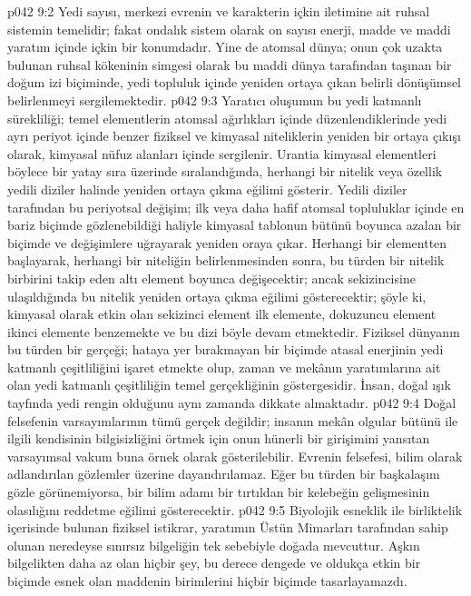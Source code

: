 \vs p042 9:2 Yedi sayısı, merkezi evrenin ve karakterin içkin iletimine ait ruhsal sistemin temelidir; fakat ondalık sistem olarak on sayısı enerji, madde ve maddi yaratım içinde içkin bir konumdadır. Yine de atomsal dünya; onun çok uzakta bulunan ruhsal kökeninin simgesi olarak bu maddi dünya tarafından taşınan bir doğum izi biçiminde, yedi topluluk içinde yeniden ortaya çıkan belirli dönüşümsel belirlenmeyi sergilemektedir.
\vs p042 9:3 Yaratıcı oluşumun bu yedi katmanlı sürekliliği; temel elementlerin atomsal ağırlıkları içinde düzenlendiklerinde yedi ayrı periyot içinde benzer fiziksel ve kimyasal niteliklerin yeniden bir ortaya çıkışı olarak, kimyasal nüfuz alanları içinde sergilenir. Urantia kimyasal elementleri böylece bir yatay sıra üzerinde sıralandığında, herhangi bir nitelik veya özellik yedili diziler halinde yeniden ortaya çıkma eğilimi gösterir. Yedili diziler tarafından bu periyotsal değişim; ilk veya daha hafif atomsal topluluklar içinde en bariz biçimde gözlenebildiği haliyle kimyasal tablonun bütünü boyunca azalan bir biçimde ve değişimlere uğrayarak yeniden oraya çıkar. Herhangi bir elementten başlayarak, herhangi bir niteliğin belirlenmesinden sonra, bu türden bir nitelik birbirini takip eden altı element boyunca değişecektir; ancak sekizincisine ulaşıldığında bu nitelik yeniden ortaya çıkma eğilimi gösterecektir; şöyle ki, kimyasal olarak etkin olan sekizinci element ilk elemente, dokuzuncu element ikinci elemente benzemekte ve bu dizi böyle devam etmektedir. Fiziksel dünyanın bu türden bir gerçeği; hataya yer bırakmayan bir biçimde atasal enerjinin yedi katmanlı çeşitliliğini işaret etmekte olup, zaman ve mekânın yaratımlarına ait olan yedi katmanlı çeşitliliğin temel gerçekliğinin göstergesidir. İnsan, doğal ışık tayfında yedi rengin olduğunu aynı zamanda dikkate almaktadır.
\vs p042 9:4 Doğal felsefenin varsayımlarının tümü gerçek değildir; insanın mekân olgular bütünü ile ilgili kendisinin bilgisizliğini örtmek için onun hünerli bir girişimini yansıtan varsayımsal vakum buna örnek olarak gösterilebilir. Evrenin felsefesi, bilim olarak adlandırılan gözlemler üzerine dayandırılamaz. Eğer bu türden bir başkalaşım gözle görünemiyorsa, bir bilim adamı bir tırtıldan bir kelebeğin gelişmesinin olasılığını reddetme eğilimi gösterecektir.
\vs p042 9:5 Biyolojik esneklik ile birliktelik içerisinde bulunan fiziksel istikrar, yaratımın Üstün Mimarları tarafından sahip olunan neredeyse sınırsız bilgeliğin tek sebebiyle doğada mevcuttur. Aşkın bilgelikten daha az olan hiçbir şey, bu derece dengede ve oldukça etkin bir biçimde esnek olan maddenin birimlerini hiçbir biçimde tasarlayamazdı.
